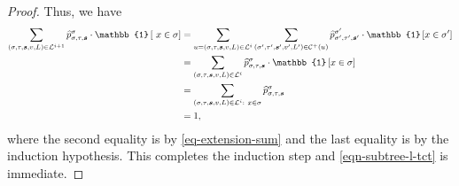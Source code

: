 \documentclass[11pt]{article}
\newcommand{\id}[1]{\mathbb{1}\left[#1\right]}
\newcommand{\seqS}{\boldsymbol{s}}
\begin{document}
\begin{proof}
    Thus, we have 
    \begin{align*}
        \sum_{(\sigma,\tau, \seqS,v,L)\in \+L^{i+1}} \widehat{p}^{\sigma}_{\sigma,\tau,\seqS}\cdot \id{\ x\in \sigma}&=\sum_{u = (\sigma,\tau, \seqS,v,L)\in \+L^{i}}\sum_{(\sigma',\tau', \seqS',v',L')\in \+C^{+}(u)} \widehat{p}^{\sigma'}_{\sigma',\tau',\seqS'}\cdot \id{ x\in \sigma'}\\
        &=\sum_{(\sigma,\tau, \seqS,v,L)\in \+L^{i}}\widehat{p}^{\sigma}_{\sigma,\tau,\seqS}\cdot \id{x \in \sigma}\\
        &=\sum_{(\sigma,\tau, \seqS,v,L)\in \+L^i:\  x\in \sigma} \widehat{p}^{\sigma}_{\sigma,\tau,\seqS}\\
        &=1,
    \end{align*}
    where the second equality is by \eqref{eq-extension-sum} and the last equality is by the induction hypothesis.
    This completes the induction step and \eqref{eqn-subtree-l-tct} is immediate.


\end{proof}
\end{document}
